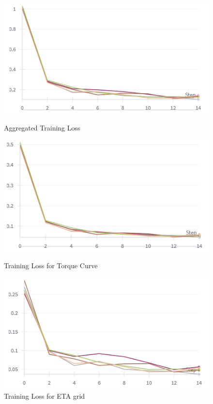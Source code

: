 \documentclass{report} %
\begin{document}
\begin{figure}[H]
    \centering
    \begin{minipage}[b]{0.3\textwidth}
        \includegraphics[width=\textwidth]{./ReportImages/train_loss.png}
        \caption{\centering Aggregated Training Loss}
        \label{fig:Aggregated Training Loss}
    \end{minipage}
    \hfill
    \begin{minipage}[b]{0.3\textwidth}
        \includegraphics[width=\textwidth]{./ReportImages/train_loss_y1.png}
        \caption{\centering Training Loss for Torque Curve}
        \label{fig:Training Loss for Torque Curve}
    \end{minipage}
    \hfill
    \begin{minipage}[b]{0.3\textwidth}
        \includegraphics[width=\textwidth]{./ReportImages/train_loss_y2.png}
        \caption{\centering Training Loss for ETA grid}
        \label{fig:Training Loss for ETA grid}
    \end{minipage}
\end{figure}
\end{document}
